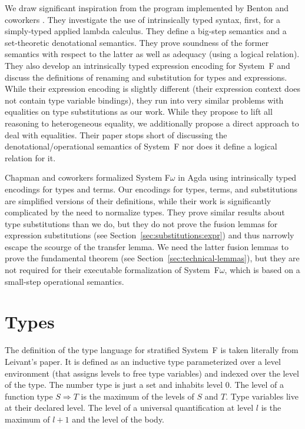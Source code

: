 \documentclass[sigplan,anonymous,review,screen]{acmart}
\begin{document}
We draw significant inspiration from the program implemented by Benton and coworkers
\cite{DBLP:journals/jar/BentonHKM12}. They investigate the use of intrinsically typed
syntax, first, for a simply-typed applied lambda calculus. They define a
big-step semantics and a set-theoretic denotational semantics. They
prove soundness of the former semantics with respect to the latter as
well as adequacy (using a logical relation). They also develop an
intrinsically typed expression encoding for System~F and discuss the
definitions of renaming and substitution for types and expressions.
While their expression encoding is slightly different (their
expression context does not contain type variable bindings), they run
into very similar problems with equalities on type substitutions as
our work. While they propose to lift all reasoning to heterogeneous
equality, we additionally propose a direct approach to deal with
equalities. 
Their paper stops short of discussing the denotational/operational
semantics of System~F nor does it define a logical relation for it.

Chapman and coworkers \cite{DBLP:conf/mpc/ChapmanKNW19} formalized
System F$\omega$ in Agda using intrinsically typed encodings for types
and terms. Our encodings for types, terms, and substitutions are
simplified versions of their definitions, while their work is
significantly complicated by the need to normalize types. They
prove similar results about type substitutions than we do, but they do not
prove the fusion lemmas for expression substitutions (see
Section~\ref{sec:substitutions:expr}) and thus narrowly escape the
scourge of the transfer lemma. We need the latter fusion lemmas to
prove the fundamental theorem (see
Section~\ref{sec:technical-lemmas}), but they are not required for
their executable formalization of System~F$\omega$, which is based on
a small-step operational semantics.


% 
\section{Types}
\label{sec:types}

The definition of the type language for stratified System~F is taken literally from Leivant's
paper. It is defined as an inductive type parameterized over a level
environment (that assigns levels to free type variables) and indexed
over the level of the type. 
\TFType
The number type is just a set and inhabits level $0$.
The level of a function type $S \Rightarrow T$ is the maximum of the
levels of $S$ and $T$.
Type variables live at their declared level.
The level of a universal quantification at
level $l$ is the maximum of $l + 1$ and the level of the body.
\end{document}
